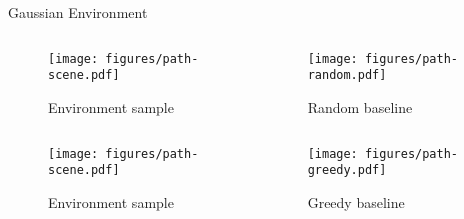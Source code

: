 
\begin{frame}
    \begin{table}
        \centering
        Gaussian Environment\par\vspace{0.5em}
        
    \end{table}


    \begin{center}
    \end{center}
\end{frame}

\begin{frame}
    \begin{columns}
        \begin{column}{0.55\textwidth}
            \begin{figure}
                \centering
                \texttt{[image: figures/path-scene.pdf]}
                \par Environment sample
            \end{figure}
        \end{column}
        \begin{column}{0.5\textwidth}
            \begin{figure}
                \centering
                \texttt{[image: figures/path-random.pdf]}
                \par Random baseline
            \end{figure}
        \end{column}
    \end{columns}
\end{frame}

\begin{frame}
    \begin{columns}
        \begin{column}{0.55\textwidth}
            \begin{figure}
                \centering
                \texttt{[image: figures/path-scene.pdf]}
                \par Environment sample
            \end{figure}
        \end{column}
        \begin{column}{0.5\textwidth}
            \begin{figure}
                \centering
                \texttt{[image: figures/path-greedy.pdf]}
                \par Greedy baseline
            \end{figure}
        \end{column}
    \end{columns}
\end{frame}

